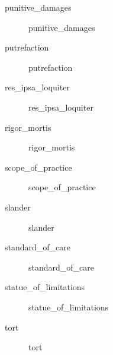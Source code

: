 \documentclass[../../EMT-169.tex]{subfiles}
\begin{document}
\begin{description}
	\item [\gls{punitive_damages}] 					\glsdesc{punitive_damages}
	\item [\gls{putrefaction}] 						\glsdesc{putrefaction}
	\item [\gls{res_ipsa_loquiter}] 				\glsdesc{res_ipsa_loquiter}
	\item [\gls{rigor_mortis}] 						\glsdesc{rigor_mortis}
	\item [\gls{scope_of_practice}] 				\glsdesc{scope_of_practice}
	\item [\gls{slander}] 							\glsdesc{slander}
	\item [\gls{standard_of_care}] 					\glsdesc{standard_of_care}
	\item [\gls{statue_of_limitations}] 			\glsdesc{statue_of_limitations}
	\item [\gls{tort}] 								\glsdesc{tort}
\end{description}\hfill \\

%	
%	
%	
%	
%	
\end{document}
